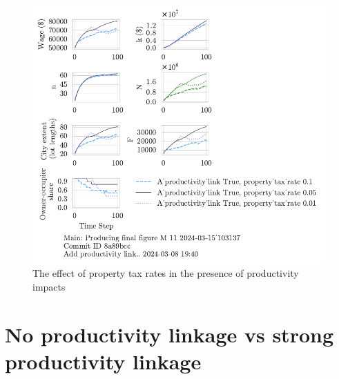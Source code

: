 \begin{figure}[h!tb] 
    \centering
    \includegraphics[scale=1, trim={0 1.4cm 0 0},clip]{fig/With-productivity_link-property_tax-103137.pdf}  %
    \caption{The effect of property tax rates in the presence of productivity impacts}
    \label{fig:Productivity_link_and_property_tax_ownership_trajectory}
\end{figure}


\newpage
\section{No productivity linkage vs strong productivity linkage }

